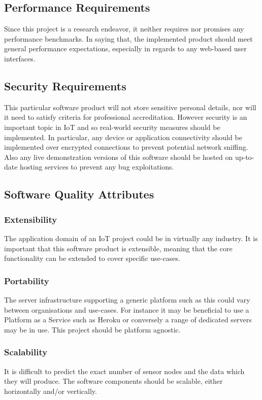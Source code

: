     \subsection{Performance Requirements}
      Since this project is a research endeavor, it neither requires nor promises any performance benchmarks. In saying that, the implemented product should meet general performance expectations, especially in regards to any web-based user interfaces.

    \subsection{Security Requirements}
      This particular software product will not store sensitive personal details, nor will it need to satisfy criteria for professional accreditation. However security is an important topic in IoT and so real-world security measures should be implemented. In particular, any device or application connectivity should be implemented over encrypted connections to prevent potential network sniffing. Also any live demonstration versions of this software should be hosted on up-to-date hosting services to prevent any bug exploitations.

    \subsection{Software Quality Attributes}
      \subsubsection{Extensibility}
        The application domain of an IoT project could be in virtually any industry. It is important that this software product is extensible, meaning that the core functionality can be extended to cover specific use-cases.

      \subsubsection{Portability}
        The server infrastructure supporting a generic platform such as this could vary between organisations and use-cases. For instance it may be beneficial to use a Platform as a Service such as Heroku or conversely a range of dedicated servers may be in use. This project should be platform agnostic. 

      \subsubsection{Scalability}
        It is difficult to predict the exact number of sensor nodes and the data which they will produce. The software components should be scalable, either horizontally and/or vertically.

